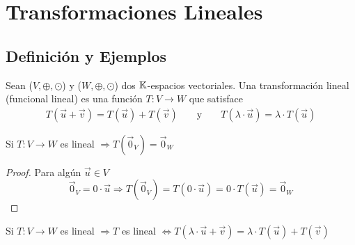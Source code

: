 \chapter{Transformaciones Lineales}

\section{Definición y Ejemplos}

\begin{definition} \label{def211}
    Sean ($V, \oplus, \odot$) y ($W, \oplus, \odot$) dos $\mathbb{K}$-espacios vectoriales. Una transformación lineal (funcional lineal) es una función $T: V \to W$ que satisface
    \begin{align*}
        T(\vec{u}+\vec{v}) = T(\vec{u}) + T(\vec{v}) && \text{ y } && T(\lambda \cdot \vec{u}) = \lambda \cdot T(\vec{u})
    \end{align*}
\end{definition}

\begin{theorem} \label{theom211}
    Si $T : V \to W$ es lineal $\Rightarrow T(\vec{0}_V) = \vec{0}_W$ 
\end{theorem}

\begin{proof}

    Para algún $\vec{u} \in V$
    $$ \vec{0}_V = 0 \cdot \vec{u} \Rightarrow T(\vec{0}_V) = T(0 \cdot \vec{u}) = 0 \cdot T(\vec{u}) = \vec{0}_W$$
\end{proof}

\begin{theorem} \label{theom212}
    Si $T : V \to W$ es lineal $\Rightarrow T$ es lineal $\iff T(\lambda \cdot \vec{u} + \vec{v}) = \lambda \cdot T(\vec{u}) + T(\vec{v})$ 
\end{theorem}

